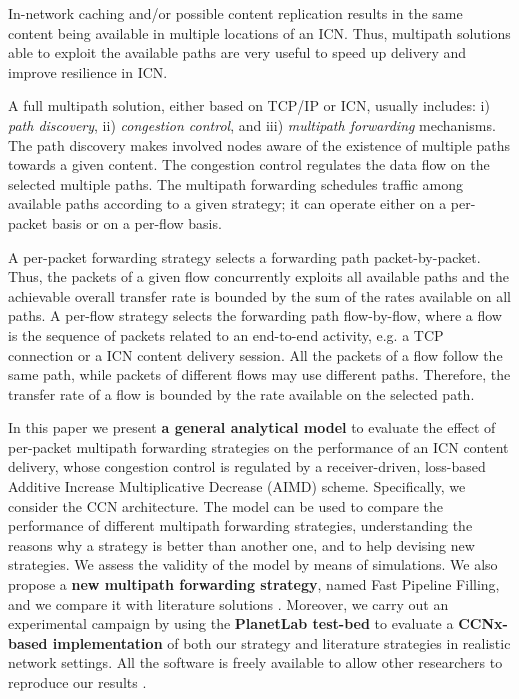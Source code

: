 \documentclass{sig-alternate-10pt}
\begin{document}
In-network caching and/or possible content replication results in the same content being available in multiple locations of an ICN. Thus, multipath solutions able to exploit the available paths are very useful to speed up delivery and improve resilience \cite{carofigliomultipath} in ICN.



A full multipath solution, either based on TCP/IP or ICN, usually includes: i) \emph{path discovery}, ii) \emph{congestion control}, and iii) \emph{multipath forwarding} mechanisms. The path discovery makes involved nodes aware of the existence of multiple paths towards a given content. The congestion control regulates the data flow on the selected multiple paths. The multipath forwarding schedules traffic among available paths according to a given strategy; it can operate either on a per-packet basis or on a per-flow basis.

A per-packet forwarding strategy selects a forwarding path packet-by-packet. Thus, the packets of a given flow concurrently exploits all available paths and the achievable overall transfer rate is bounded by the sum of the rates available on all paths.
A per-flow strategy selects the forwarding path flow-by-flow, where a flow is the sequence of packets related to an end-to-end activity, e.g. a TCP connection or a ICN content delivery session. All the packets of a flow follow the same path, while packets of different flows may use different paths. Therefore, the transfer rate of a flow is bounded by the rate available on the selected path.

In this paper we present \textbf{a general analytical model} to evaluate the effect of per-packet multipath forwarding strategies on the performance of an ICN content delivery, whose congestion control is regulated by a receiver-driven, loss-based Additive Increase Multiplicative Decrease (AIMD) scheme. Specifically, we consider the CCN architecture. The model can be used to compare the performance of different multipath forwarding strategies, understanding the reasons why a strategy is better than another one, and to help devising new strategies. We assess the validity of the model by means of simulations.
We also propose a \textbf{new multipath forwarding strategy}, named Fast Pipeline Filling, and we compare it with literature solutions \cite{udugama} \cite{carofigliooptimal}. Moreover, we carry out an experimental campaign by using the \textbf{PlanetLab test-bed} to evaluate a \textbf{CCNx-based implementation} of both our strategy and literature strategies in realistic network settings. All the software is freely available to allow other researchers to reproduce our results \cite{software}.
\end{document}

